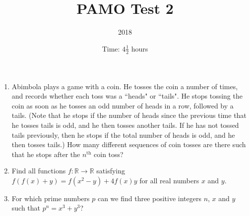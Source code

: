 \documentclass{article}
\title{PAMO Test 2}
\author{2018}
\date{Time: $4\frac{1}{2}$ hours}
\begin{document}
\maketitle

\begin{enumerate}

\item %
Abimbola plays a game with a coin. He tosses the coin a number of times, and
records whether each toss was a ``heads" or ``tails". He stops tossing the coin
as soon as he tosses an odd number of heads in a row, followed by a tails.
(Note that he stops if the number of heads since the previous time that he
tosses tails is odd, and he then tosses another tails. If he has not tossed
tails previously, then he stops if the total number of heads is odd, and he then
tosses tails.) How many different sequences of coin tosses are there such that
he stops after the $n^\text{th}$ coin toss?

\item %
Find all functions $f: \mathbb{R} \to \mathbb{R}$ satisfying $f(f(x) + y) = f(x^2
- y) + 4f(x)y$ for all real numbers $x$ and $y$.

\item %
For which prime numbers $p$ can we find three positive integers $n$, $x$ and $y$
such that $p^n = x^3 + y^3$?

\end{enumerate}
\end{document}
